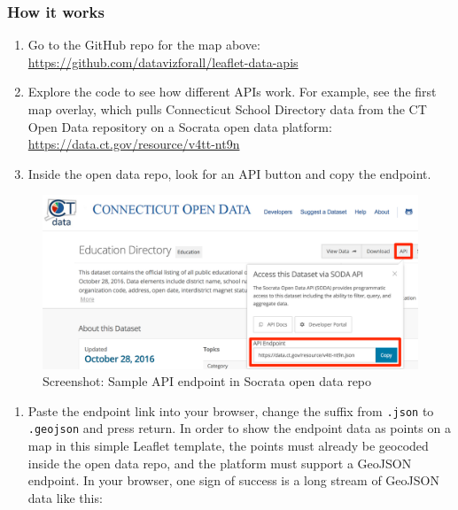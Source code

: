 \documentclass[
  english,
]{book}
\providecommand{\tightlist}{%
  \setlength{\itemsep}{0pt}\setlength{\parskip}{0pt}}
\begin{document}
\hypertarget{how-it-works-1}{%
\subsubsection*{How it works}\label{how-it-works-1}}

\begin{enumerate}
\def\labelenumi{\arabic{enumi})}
\item
  Go to the GitHub repo for the map above: \url{https://github.com/datavizforall/leaflet-data-apis}
\item
  Explore the code to see how different APIs work. For example, see the first map overlay, which pulls Connecticut School Directory data from the CT Open Data repository on a Socrata open data platform: \url{https://data.ct.gov/resource/v4tt-nt9n}
\item
  Inside the open data repo, look for an API button and copy the endpoint.
\end{enumerate}

\begin{figure}
\centering
\includegraphics{images/13-leaflet/ct-open-data-api-endpoint.png}
\caption{Screenshot: Sample API endpoint in Socrata open data repo}
\end{figure}

\begin{enumerate}
\def\labelenumi{\arabic{enumi})}
\setcounter{enumi}{3}
\tightlist
\item
  Paste the endpoint link into your browser, change the suffix from \texttt{.json} to \texttt{.geojson} and press return. In order to show the endpoint data as points on a map in this simple Leaflet template, the points must already be geocoded inside the open data repo, and the platform must support a GeoJSON endpoint. In your browser, one sign of success is a long stream of GeoJSON data like this:
\end{enumerate}
\end{document}
